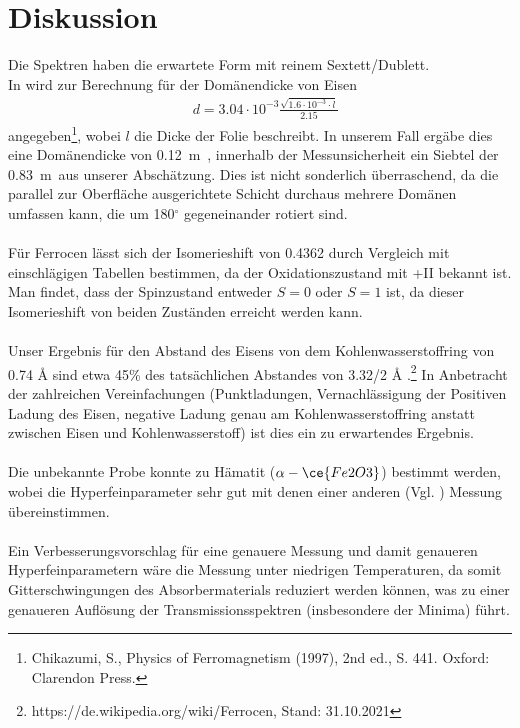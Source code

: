 \documentclass[german,  %
parskip=full,  %
headsepline]{scrartcl}
\newcommand{\mum}{\:\si{\mu m\:}}
\newcommand{\ten}[1]{\cdot10^{#1}}
\newcommand{\bcref}[1]{\namecref{#1} \textcolor{blue}{\labelcref{#1}}}
\begin{document}
\section{Diskussion}
Die Spektren haben die erwartete Form mit reinem Sextett/Dublett.\\
In  wird zur Berechnung für der Domänendicke von Eisen 
\begin{align}
&d=3.04\ten{-3}\frac{\sqrt{1.6\ten{-3}\cdot l}}{2.15}
\end{align}
angegeben\footnote{Chikazumi, S., Physics of Ferromagnetism (1997), 2nd ed., S.  441. Oxford: Clarendon Press.}, wobei $l$ die Dicke der Folie beschreibt.  In unserem Fall ergäbe dies eine Domänendicke von 0.12\mum, innerhalb der Messunsicherheit ein Siebtel der 0.83\mum aus unserer Abschätzung. Dies ist nicht sonderlich überraschend, da die parallel zur Oberfläche ausgerichtete Schicht durchaus mehrere Domänen umfassen kann, die um 180$^\circ$ gegeneinander rotiert sind.\\\\
Für Ferrocen lässt sich
der Isomerieshift von 0.4362 \si{} durch Vergleich mit einschlägigen Tabellen bestimmen, da der Oxidationszustand mit +II bekannt ist. Man findet, dass der Spinzustand entweder $S=0$ oder $S=1$ ist, da dieser Isomerieshift von beiden Zuständen erreicht werden kann.\\\\
Unser Ergebnis für den Abstand des Eisens von dem Kohlenwasserstoffring von 0.74 \si{\angstrom} sind etwa 45\% des tatsächlichen Abstandes von 3.32/2 \si{\angstrom} .\footnote{https://de.wikipedia.org/wiki/Ferrocen, Stand: 31.10.2021} In Anbetracht der zahlreichen Vereinfachungen (Punktladungen, Vernachlässigung der Positiven Ladung des Eisen, negative Ladung genau am Kohlenwasserstoffring anstatt zwischen Eisen und Kohlenwasserstoff) ist dies ein zu erwartendes Ergebnis.\\\\
Die unbekannte Probe konnte zu Hämatit ($\alpha-\ce{Fe2O3}$) bestimmt werden, wobei die Hyperfeinparameter sehr gut mit denen einer anderen (Vgl. \bcref{mystery}) Messung übereinstimmen.\\\\
Ein Verbesserungsvorschlag für eine genauere Messung und damit genaueren Hyperfeinparametern wäre die Messung unter niedrigen Temperaturen, da somit Gitterschwingungen des Absorbermaterials reduziert werden können, was zu einer genaueren Auflösung der Transmissionsspektren (insbesondere der Minima) führt.

    
\end{document}
